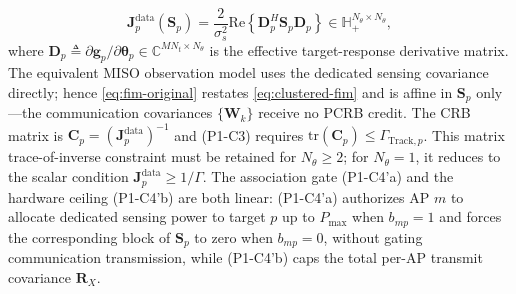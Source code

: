 \documentclass[12pt,a4paper]{article}
\newcommand{\vect}[1]{\mathbf{#1}}
\newcommand{\mat}[1]{\mathbf{#1}}
\newcommand{\tr}{\text{tr}}
\newcommand{\Real}{\text{Re}}
\begin{document}
\begin{equation}\label{eq:fim-original}
\mat{J}_p^{\text{data}}(\mat{S}_p) = \frac{2}{\sigma_s^2} \Real\!\left\{ \mat{D}_p^H \mat{S}_p \mat{D}_p \right\} \in \mathbb{H}_+^{N_\theta \times N_\theta},
\end{equation}
where $\mat{D}_p \triangleq \partial \vect{g}_p / \partial \boldsymbol{\theta}_p \in \mathbb{C}^{MN_t \times N_\theta}$ is the effective target-response derivative matrix. The equivalent MISO observation model uses the dedicated sensing covariance directly; hence \eqref{eq:fim-original} restates \eqref{eq:clustered-fim} and is affine in $\mat{S}_p$ only---the communication covariances $\{\mat{W}_k\}$ receive no PCRB credit. The CRB matrix is $\mat{C}_p=(\mat{J}_p^{\text{data}})^{-1}$ and (P1-C3) requires $\tr(\mat{C}_p)\leq\Gamma_{\text{Track},p}$. This matrix trace-of-inverse constraint must be retained for $N_\theta\geq2$; for $N_\theta=1$, it reduces to the scalar condition $\mat{J}_p^{\text{data}}\geq1/\Gamma$. The association gate (P1-C4'a) and the hardware ceiling (P1-C4'b) are both linear: (P1-C4'a) authorizes AP $m$ to allocate dedicated sensing power to target $p$ up to $P_{\max}$ when $b_{mp}=1$ and forces the corresponding block of $\mat{S}_p$ to zero when $b_{mp}=0$, without gating communication transmission, while (P1-C4'b) caps the total per-AP transmit covariance $\mat{R}_X$.
\end{document}
